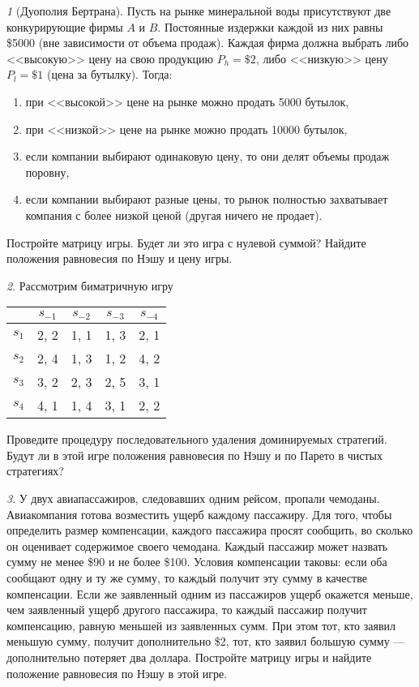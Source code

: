 \documentclass[12pt]{article}
\theoremstyle{remark}
\newtheorem{exercise}{}[subsection]
\begin{document}
\begin{exercise}[Дуополия Бертрана]
Пусть на рынке минеральной воды присутствуют две конкурирующие фирмы $A$ и $B$. 
Постоянные издержки каждой из них равны \$5000
(вне зависимости от объема продаж). Каждая фирма
должна выбрать либо <<высокую>> цену на свою продукцию $P_h=\$2$, либо <<низкую>> цену $P_l=\$1$
(цена за бутылку). Тогда:
\begin{enumerate}
	\item при <<высокой>> цене на рынке можно продать 5000 бутылок,
	\item при <<низкой>> цене на рынке можно продать 10000 бутылок,
	\item если компании выбирают одинаковую цену, то они делят объемы продаж поровну,
	\item если компании выбирают разные цены, то рынок полностью захватывает компания
	с более низкой ценой (другая ничего не продает).
\end{enumerate}
Постройте матрицу игры. Будет ли это игра с нулевой суммой? Найдите положения равновесия
по Нэшу и цену игры.
\end{exercise}

\begin{exercise}
Рассмотрим биматричную игру
\begin{center}
	\begin{tabular}{|c||c|c|c|c|}
	 \hline
	& $s_{-1}$ & $s_{-2}$ & $s_{-3}$ & $s_{-4}$\\ \hline \hline
	$s_1$ & 2, 2 & 1, 1 & 1, 3 & 2, 1\\ \hline
	$s_2$ & 2, 4 & 1, 3 & 1, 2 & 4, 2\\ \hline
	$s_3$ & 3, 2 & 2, 3 & 2, 5 & 3, 1 \\ \hline
	$s_4$ & 4, 1 & 1, 4 & 3, 1 & 2, 2 \\
	\hline
	\end{tabular}
\end{center}
Проведите процедуру последовательного удаления доминируемых стратегий.
Будут ли в этой игре положения равновесия по Нэшу и по Парето в чистых стратегиях?
\end{exercise}

\begin{exercise}
У двух авиапассажиров, следовавших одним рейсом, пропали чемоданы. 
Авиакомпания готова возместить ущерб каждому пассажиру. 
Для того, чтобы определить размер компенсации, каждого пассажира просят сообщить, 
во сколько он оценивает содержимое своего чемодана. 
Каждый пассажир может назвать сумму не менее \$90 и не более \$100. 
Условия компенсации таковы: если оба сообщают одну и ту же сумму, 
то каждый получит эту сумму в качестве компенсации. 
Если же заявленный одним из пассажиров ущерб окажется меньше, 
чем заявленный ущерб другого пассажира, то каждый пассажир получит компенсацию, 
равную меньшей из заявленных сумм. При этом тот, кто заявил меньшую сумму,
получит дополнительно \$2, тот, кто заявил большую сумму — дополнительно потеряет два доллара.
Постройте матрицу игры и найдите положение равновесия по Нэшу в этой игре.
\end{exercise}
\end{document}
